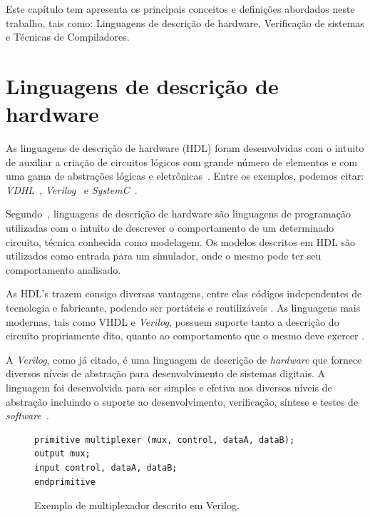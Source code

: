 \label{chapter:conceitos}
Este capítulo tem apresenta os principais conceitos e definições abordados neste trabalho, tais como: Linguagens de descrição de hardware, Verificação de sistemas e Técnicas de Compiladores.

\section{Linguagens de descrição de hardware}

As linguagens de descrição de hardware (HDL) foram desenvolvidas com o intuito de auxiliar a criação de circuitos lógicos com grande número de elementos e com uma gama de abstrações lógicas e eletrônicas~\cite{thomas2008verilog}. Entre os exemplos, podemos citar: \textit{VDHL}~\cite{IEEEVHDLLanguage}, \textit{Verilog}~\cite{IEEEVerilogLanguage} e \textit{SystemC}~\cite{IEEESystemCLanguage}.

\par
Segundo~, linguagens de descrição de hardware são linguagens de programação utilizadas com o intuito de descrever o comportamento de um determinado circuito, técnica conhecida como modelagem. Os modelos descritos em HDL são utilizados como entrada para um simulador, onde o mesmo pode ter seu comportamento analisado.

\par
As HDL's trazem consigo diversas vantagens, entre elas códigos independentes de tecnologia e fabricante, podendo ser portáteis e reutilizáveis \cite{cappelattipraticando}. As linguagens mais modernas, tais como VHDL e \textit{Verilog}, possuem suporte tanto a descrição do circuito propriamente dito, quanto ao comportamento que o mesmo deve exercer \cite{christen1999vhdl}.

\par
A \textit{Verilog}, como já citado, é uma linguagem de descrição de \textit{hardware} que fornece diversos níveis de abstração para desenvolvimento de sistemas digitais\cite{thomas2008verilog}. A linguagem foi desenvolvida para ser simples e efetiva nos diversos níveis de abstração incluindo o suporte ao desenvolvimento, verificação, síntese e testes de \textit{software}~\cite{IEEEVerilogLanguage}.

\begin{figure}[H]
\caption{\label{fig:mux_verilog} Exemplo de multiplexador descrito em Verilog.}
	\begin{center}
    \begin{minipage}{0.7\textwidth}
    \begin{lstlisting}       
primitive multiplexer (mux, control, dataA, dataB);
output mux;
input control, dataA, dataB;
endprimitive
\end{lstlisting}
    \end{minipage}
	\end{center}
\end{figure}

